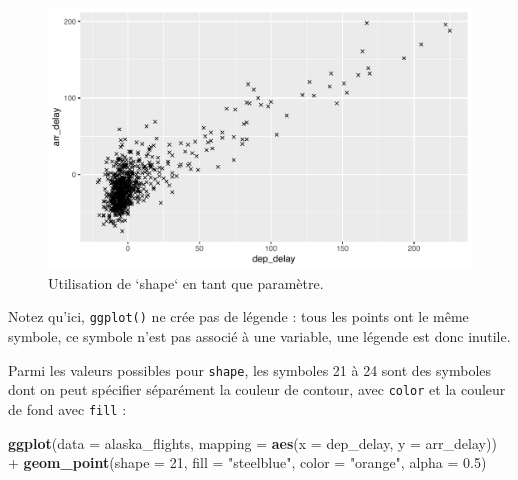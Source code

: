 \documentclass[a4paperpaper,]{article}
\newenvironment{Shaded}{\begin{snugshade}}{\end{snugshade}}
\newcommand{\DataTypeTok}[1]{\textcolor[rgb]{0.00,0.34,0.68}{#1}}
\newcommand{\DecValTok}[1]{\textcolor[rgb]{0.69,0.50,0.00}{#1}}
\newcommand{\FloatTok}[1]{\textcolor[rgb]{0.69,0.50,0.00}{#1}}
\newcommand{\KeywordTok}[1]{\textcolor[rgb]{0.12,0.11,0.11}{\textbf{#1}}}
\newcommand{\NormalTok}[1]{\textcolor[rgb]{0.12,0.11,0.11}{#1}}
\newcommand{\OperatorTok}[1]{\textcolor[rgb]{0.12,0.11,0.11}{#1}}
\newcommand{\StringTok}[1]{\textcolor[rgb]{0.75,0.01,0.01}{#1}}
\begin{document}
\begin{figure}[htpb]

{\centering \includegraphics[width=0.9\linewidth]{figure/shapeplot2-1} 

}

\caption{Utilisation de `shape` en tant que paramètre.}\label{fig:shapeplot2}
\end{figure}

Notez qu'ici, \texttt{ggplot()} ne crée pas de légende : tous les points ont le même symbole, ce symbole n'est pas associé à une variable, une légende est donc inutile.

Parmi les valeurs possibles pour \texttt{shape}, les symboles 21 à 24 sont des symboles dont on peut spécifier séparément la couleur de contour, avec \texttt{color} et la couleur de fond avec \texttt{fill} :

\begin{Shaded}
\begin{Highlighting}[]
\KeywordTok{ggplot}\NormalTok{(}\DataTypeTok{data =}\NormalTok{ alaska_flights, }\DataTypeTok{mapping =} \KeywordTok{aes}\NormalTok{(}\DataTypeTok{x =}\NormalTok{ dep_delay, }\DataTypeTok{y =}\NormalTok{ arr_delay)) }\OperatorTok{+}
\StringTok{  }\KeywordTok{geom_point}\NormalTok{(}\DataTypeTok{shape =} \DecValTok{21}\NormalTok{, }\DataTypeTok{fill =} \StringTok{"steelblue"}\NormalTok{, }\DataTypeTok{color =} \StringTok{"orange"}\NormalTok{, }\DataTypeTok{alpha =} \FloatTok{0.5}\NormalTok{)}
\end{Highlighting}
\end{Shaded}
\end{document}
